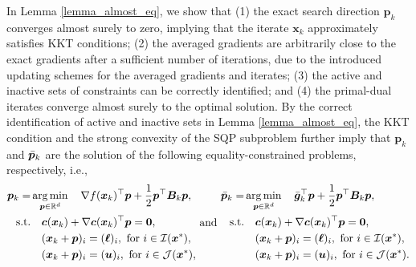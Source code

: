 \documentclass[aos]{imsart}
\numberwithin{equation}{section}
\theoremstyle{plain}
\newcommand{\michael}[1]{\textcolor{red}{Michael:\ #1}}
\newcommand{\yihang}[1]{\textcolor{blue}{Yihang:\ #1}}
\begin{document}
In Lemma \ref{lemma_almost_eq}, we show that (1) the exact search direction $\bm{p}_k$ converges almost surely to zero, implying that the iterate $\bm{x}_k$ approximately satisfies KKT conditions; (2) the averaged gradients are arbitrarily close to the exact gradients after a sufficient number of iterations, due to the introduced updating schemes for the averaged gradients and iterates; (3) the active and inactive sets of constraints can be correctly identified; and (4) the primal-dual iterates converge almost surely to the optimal solution.
By the correct identification of active and inactive sets in Lemma \ref{lemma_almost_eq}, 
the KKT condition and the strong convexity of the SQP subproblem further imply that $\bm{p}_k$ and $\Bar{\bm{p}}_k$ are the solution of the following equality-constrained problems, respectively, i.e.,
   \begin{equation}
      \label{eq9}
       \begin{split}
        \bm{p}_k = & \mathop{\arg \min}_{\bm{p} \in \mathbb{R}^{d}} \hspace{1em}  \nabla f(\bm{x}_k)^{\top}\bm{p}+ \frac{1}{2}\bm{p}^{\top}\bm{B}_k\bm{p},\\
        \text{s.t.} & \hspace{1em} \bm{c}(\bm{x}_k)+\nabla \bm{c}(\bm{x}_k)^{\top}\bm{p} = \bm{0},\\
        & \hspace{1em} (\bm{x}_k + \bm{p})_i = (\bm{\ell})_i,~\text{for}~ i \in \mathcal{I}(\bm{x}^{*}),\\
        & \hspace{1em} (\bm{x}_k + \bm{p})_i = (\bm{u})_i,~\text{for}~ i \in \mathcal{J}(\bm{x}^{*}),
    \end{split}  
    ~\text{and}~
       \begin{split}
        \Bar{\bm{p}}_k = & \mathop{\arg \min}_{\bm{p} \in \mathbb{R}^{d}}  \hspace{1em}  \Bar{\bm{g}}_k^{\top}\bm{p}+ \frac{1}{2}\bm{p}^{\top}\bm{B}_k\bm{p},\\
        \text{s.t.} & \hspace{1em} \bm{c}(\bm{x}_k)+\nabla \bm{c}(\bm{x}_k)^{\top}\bm{p} = \bm{0},\\
        & \hspace{1em} (\bm{x}_k + \bm{p})_i = (\bm{\ell})_i,~\text{for}~ i \in \mathcal{I}(\bm{x}^{*}),\\
        & \hspace{1em} (\bm{x}_k + \bm{p})_i = (\bm{u})_i,~\text{for}~ i \in \mathcal{J}(\bm{x}^{*}).
    \end{split}    
   \end{equation}
\end{document}
